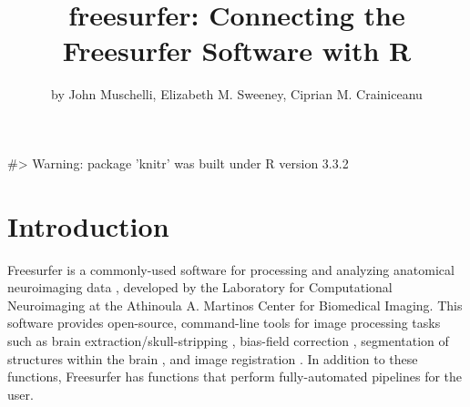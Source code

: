 \title{freesurfer: Connecting the Freesurfer Software with R}
\author{by John Muschelli, Elizabeth M. Sweeney, Ciprian M. Crainiceanu}

\maketitle


\begin{Schunk}
\begin{Soutput}
#> Warning: package 'knitr' was built under R version 3.3.2
\end{Soutput}
\end{Schunk}

\section{Introduction}\label{introduction}

\label{sec:intro}

Freesurfer is a commonly-used software for processing and analyzing
anatomical neuroimaging data \citep{fischl2012freesurfer}, developed by
the Laboratory for Computational Neuroimaging at the Athinoula A.
Martinos Center for Biomedical Imaging. This software provides
open-source, command-line tools for image processing tasks such as brain
extraction/skull-stripping \citep{segonne2004hybrid}, bias-field
correction \citep{sled_nonparametric_1998}, segmentation of structures
within the brain \citep{fischl2002whole,fischl2004sequence}, and image
registration \citep{fischl1999high,reuter2010highly}. In addition to
these functions, Freesurfer has functions that perform fully-automated
pipelines for the user.

